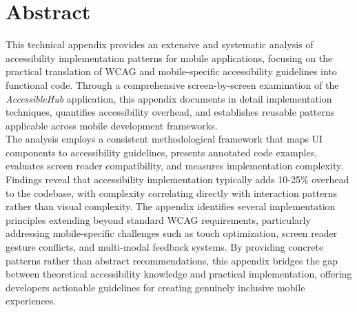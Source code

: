 \cleardoublepage
{}
{}
\begingroup
\let\clearpage\relax
\let\cleardoublepage\relax
\chapter*{Abstract}

This technical appendix provides an extensive and systematic analysis of accessibility implementation patterns for mobile applications, focusing on the practical translation of WCAG and mobile-specific accessibility guidelines into functional code. Through a comprehensive screen-by-screen examination of the \textit{AccessibleHub} application, this appendix documents in detail implementation techniques, quantifies accessibility overhead, and establishes reusable patterns applicable across mobile development frameworks. \\

The analysis employs a consistent methodological framework that maps UI components to accessibility guidelines, presents annotated code examples, evaluates screen reader compatibility, and measures implementation complexity. Findings reveal that accessibility implementation typically adds 10-25\% overhead to the codebase, with complexity correlating directly with interaction patterns rather than visual complexity. The appendix identifies several implementation principles extending beyond standard WCAG requirements, particularly addressing mobile-specific challenges such as touch optimization, screen reader gesture conflicts, and multi-modal feedback systems. By providing concrete patterns rather than abstract recommendations, this appendix bridges the gap between theoretical accessibility knowledge and practical implementation, offering developers actionable guidelines for creating genuinely inclusive mobile experiences.


\endgroup
\vfill